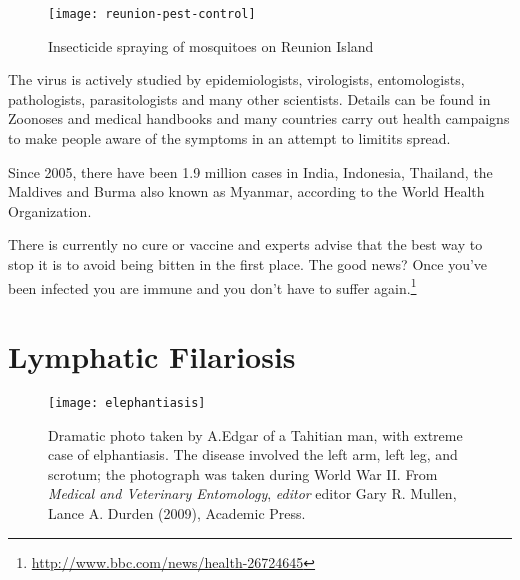 \begin{figure}[htbp]
\texttt{[image: reunion-pest-control]}
\caption{Insecticide spraying of mosquitoes on Reunion Island}
\end{figure}

The virus is actively studied by epidemiologists, virologists, entomologists, pathologists, parasitologists and many other scientists. Details can be found in Zoonoses and medical  handbooks and many countries carry out health campaigns to make people aware of the symptoms in an attempt to limitits spread.

Since 2005, there have been 1.9 million cases in India, Indonesia, Thailand, the Maldives and Burma also known as Myanmar, according to the World Health Organization.

There is currently no cure or vaccine and experts advise that the best way to stop it is to avoid being bitten in the first place. The good news? Once you've been infected you are immune and you don't have to suffer again.\footnote{\protect\url{http://www.bbc.com/news/health-26724645}}


\chapter{Lymphatic Filariosis}

\begin{figure}[htbp]
\texttt{[image: elephantiasis]}
\caption{Dramatic photo taken by A.Edgar of a Tahitian man, with extreme case of elphantiasis. The disease involved the left arm, left leg, and scrotum; the photograph was taken during World War II. From \emph{Medical and Veterinary Entomology}, \emph{editor} editor Gary R. Mullen, Lance A. Durden (2009), Academic Press. }
\end{figure}







